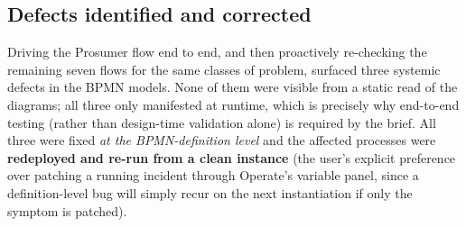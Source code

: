 \documentclass[11pt,a4paper]{article}
\begin{document}
\subsection{Defects identified and corrected}
\label{sec:bugs}
 
Driving the Prosumer flow end to end, and then proactively re-checking the
remaining seven flows for the same classes of problem, surfaced three
systemic defects in the BPMN models. None of them were visible from a static
read of the diagrams; all three only manifested at runtime, which is precisely
why end-to-end testing (rather than design-time validation alone) is required
by the brief. All three were fixed \emph{at the BPMN-definition level} and the
affected processes were \textbf{redeployed and re-run from a clean instance}
(the user's explicit preference over patching a running incident through
Operate's variable panel, since a definition-level bug will simply recur on
the next instantiation if only the symptom is patched).
 
\end{document}
